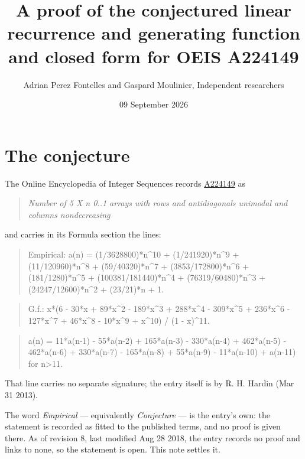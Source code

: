 \documentclass[11pt]{article}
\title{A proof of the conjectured linear recurrence and generating function and closed form for OEIS A224149}
\author{Adrian Perez Fontelles and Gaspard Moulinier, Independent researchers}
\date{09 September 2026}
\theoremstyle{definition}
\begin{document}
\maketitle
\section{The conjecture}

The Online Encyclopedia of Integer Sequences records \href{https://oeis.org/A224149}{A224149} as

\begin{quote}\itshape Number of 5 X n 0..1 arrays with rows and antidiagonals unimodal and columns nondecreasing\end{quote}

and carries in its Formula section the lines:

\begin{quote}\ttfamily Empirical: a(n) = (1/3628800)*n\textasciicircum{}10 + (1/241920)*n\textasciicircum{}9 + (11/120960)*n\textasciicircum{}8 + (59/40320)*n\textasciicircum{}7 + (3853/172800)*n\textasciicircum{}6 + (181/1280)*n\textasciicircum{}5 + (100381/181440)*n\textasciicircum{}4 + (76319/60480)*n\textasciicircum{}3 + (24247/12600)*n\textasciicircum{}2 + (23/21)*n + 1.\end{quote}

\begin{quote}\ttfamily G.f.: x*(6 - 30*x + 89*x\textasciicircum{}2 - 189*x\textasciicircum{}3 + 288*x\textasciicircum{}4 - 309*x\textasciicircum{}5 + 236*x\textasciicircum{}6 - 127*x\textasciicircum{}7 + 46*x\textasciicircum{}8 - 10*x\textasciicircum{}9 + x\textasciicircum{}10) / (1 - x)\textasciicircum{}11.\end{quote}

\begin{quote}\ttfamily a(n) = 11*a(n-1) - 55*a(n-2) + 165*a(n-3) - 330*a(n-4) + 462*a(n-5) - 462*a(n-6) + 330*a(n-7) - 165*a(n-8) + 55*a(n-9) - 11*a(n-10) + a(n-11) for n>11.\end{quote}

That line carries no separate signature; the entry itself is by R. H. Hardin (Mar 31 2013).

The word {\itshape Empirical} --- equivalently {\itshape Conjecture} --- is the entry's own: the statement is recorded as fitted to the published terms, and no proof is given there. As of revision 8, last modified Aug 28 2018, the entry records no proof and links to none, so the statement is open. This note settles it.
\end{document}

